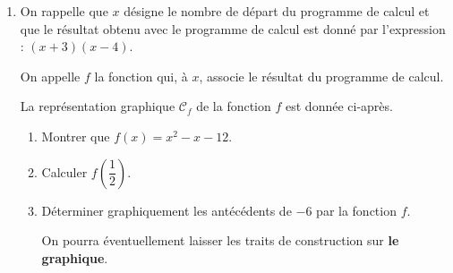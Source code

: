 \documentclass[a4paper,11pt]{article}
\begin{document}
\begin{enumerate}[resume]
\item On rappelle que $x$ désigne le nombre de départ du programme de calcul et que le résultat obtenu avec le programme de calcul est donné par l'expression : $(x + 3)(x - 4)$.

On appelle $f$ la fonction qui, à $x$, associe le résultat du programme de calcul.

La représentation graphique $\mathcal{C}_f$ de la fonction $f$ est donnée ci-après.
  \begin{enumerate}[label=\alph*., itemsep=3pt]
    \item Montrer que $f(x) = x^2 - x - 12$.
    \item Calculer $f\!\left(\dfrac{1}{2}\right)$.
    \item Déterminer graphiquement les antécédents de $-6$ par la fonction $f$.

    On pourra éventuellement laisser les traits de construction sur \textbf{le graphique}.
  \end{enumerate}
\end{enumerate}

\begin{center}
\end{center}
\end{document}
